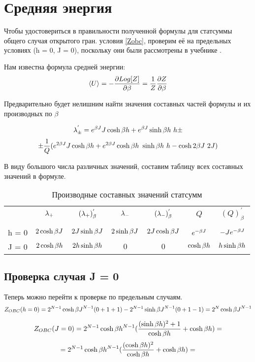 \section{Средняя энергия}

Чтобы удостовериться в правильности полученной формулы для статсуммы общего случая открытого гран. условия \eqref{Zobc}, проверим её на предельных условиях (h = 0, J = 0), поскольку они были рассмотрены в учебнике \cite{Swen}.

Нам известна формула средней энергии:
\begin{equation}\label{MeanE}
    \langle U \rangle = -\frac{\partial Log[Z]}{\partial \beta} = \frac{1}{Z} \frac{\partial Z}{\partial \beta}
\end{equation}

Предварительно будет нелишним найти значения составных частей формулы и их производных по $\beta$

\[ \lambda_{\pm}^{'} = e^{\beta J}J\cosh{\beta h} + e^{\beta J}\sinh{\beta h}\ h \pm \]
\[\pm \frac{1}{Q}  (e^{2 \beta J}J\cosh{\beta h} + e^{2 \beta J}\cosh{\beta h}\ \sinh{\beta h}\ h - \cosh{2 \beta J}\ 2J) \] 

В виду большого числа различных значений, составим таблицу всех составных значений в формуле.
\begin{table}[h!]\label{derLTab}
    \centering
    \begin{tabular}{c c c c c c c}
         & $\lambda_{+}$ & $(\lambda_{+})^{'}_{\beta}$ & $\lambda_{-}$ & $(\lambda_{-})^{'}_{\beta}$ & $Q$ & $(Q)^{'}_{\beta}$  \\ \\
        h = 0 & $2\cosh{\beta J}$ & $2J\sinh{\beta J}$ & $2\sinh{\beta J}$ & $2J\cosh{\beta J}$ & $e^{-\beta J}$ & $-J e^{-\beta J}$ \\
        J = 0 & $2\cosh{\beta h}$ & $2h\sinh{\beta h}$ & $0$ & $0$ & $\cosh{\beta h}$ & $h\sinh{\beta h}$\\
    \end{tabular}
    \caption{Производные составных значений статсумм}
\end{table}



\subsection{Проверка случая J = 0}

Теперь можно перейти к проверке по предельным случаям.
\[ Z_{OBC}(h = 0) = 2^{N-1}\cosh{\beta J}^{N-1} (0 + 1 + 1) - 2^{N-1}\sinh{\beta J}^{N-1} (0 + 1 - 1) = 2^{N}\cosh{\beta J}^{N-1}\]

\[ Z_{OBC}(J = 0) = 2^{N-1}\cosh{\beta h}^{N-1} (\frac{(\sinh{\beta h})^{2} + 1}{\cosh{\beta h}} +\cosh{\beta h}) = \]
\[=2^{N-1}\cosh{\beta h}^{N-1} (\frac{(\cosh{\beta h})^{2}}{\cosh{\beta h}} +\cosh{\beta h}) = \]

